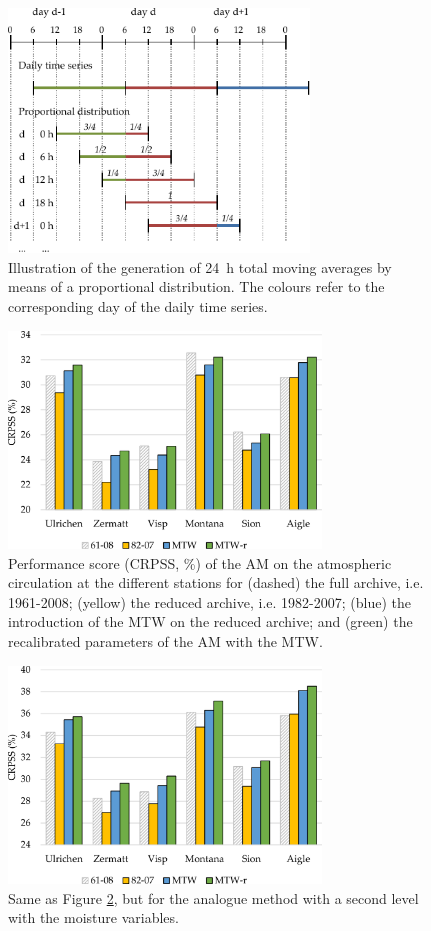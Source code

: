 \documentclass[hess, manuscript]{copernicus}
\begin{document}
	\begin{figure}[htb]
		\begin{center}
			\includegraphics[width=8cm]{figures/illustration_disaggregation.pdf}
		\end{center}
		\caption{Illustration of the generation of 24~h total moving averages by means of a proportional distribution. The colours refer to the corresponding day of the daily time series.}
		\label{fig:illustration_disaggregation}
	\end{figure}
	
	\begin{figure}[htb]
		\includegraphics[width=8.3cm]{figures/plots_CRPSS_2Z.pdf}
		\caption{Performance score (CRPSS, \%) of the AM on the atmospheric circulation at the different stations for (dashed) the full archive, i.e. 1961-2008; (yellow) the reduced archive, i.e. 1982-2007; (blue) the introduction of the MTW on the reduced archive; and (green) the recalibrated parameters of the AM with the MTW.}
		\label{fig:plots_CRPSS_2Z}
	\end{figure}
	
	\begin{figure}[htb]
		\includegraphics[width=8.3cm]{figures/plots_CRPSS_2Z-2MI.pdf}
		\caption{Same as Figure \ref{fig:plots_CRPSS_2Z}, but for the analogue method with a second level with the moisture variables.}
		\label{fig:plots_CRPSS_2Z-2MI}
	\end{figure}
	
\end{document}
